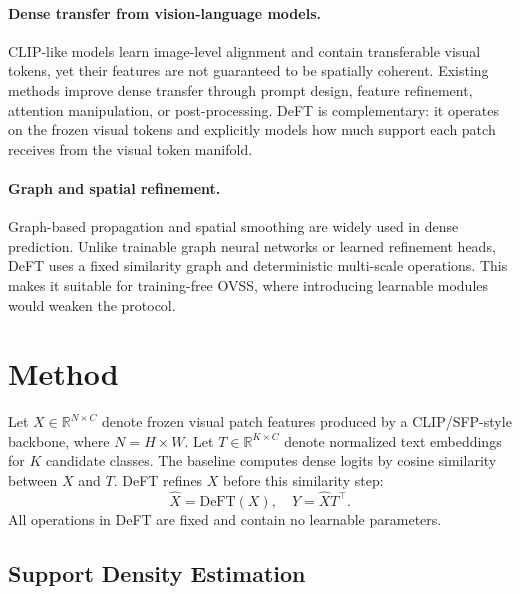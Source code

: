 \documentclass[letterpaper]{article}
\begin{document}
\paragraph{Dense transfer from vision-language models.}
CLIP-like models learn image-level alignment and contain transferable visual
tokens, yet their features are not guaranteed to be spatially coherent. Existing
methods improve dense transfer through prompt design, feature refinement,
attention manipulation, or post-processing. DeFT is complementary: it operates
on the frozen visual tokens and explicitly models how much support each patch
receives from the visual token manifold.

\paragraph{Graph and spatial refinement.}
Graph-based propagation and spatial smoothing are widely used in dense
prediction. Unlike trainable graph neural networks or learned refinement heads,
DeFT uses a fixed similarity graph and deterministic multi-scale operations.
This makes it suitable for training-free OVSS, where introducing learnable
modules would weaken the protocol.

\section{Method}

Let $X \in \mathbb{R}^{N \times C}$ denote frozen visual patch features produced
by a CLIP/SFP-style backbone, where $N=H \times W$. Let $T \in
\mathbb{R}^{K \times C}$ denote normalized text embeddings for $K$ candidate
classes. The baseline computes dense logits by cosine similarity between $X$
and $T$. DeFT refines $X$ before this similarity step:
\begin{equation}
    \hat{X} = \mathrm{DeFT}(X), \quad
    Y = \hat{X} T^\top.
\end{equation}
All operations in DeFT are fixed and contain no learnable parameters.

\subsection{Support Density Estimation}
\end{document}
